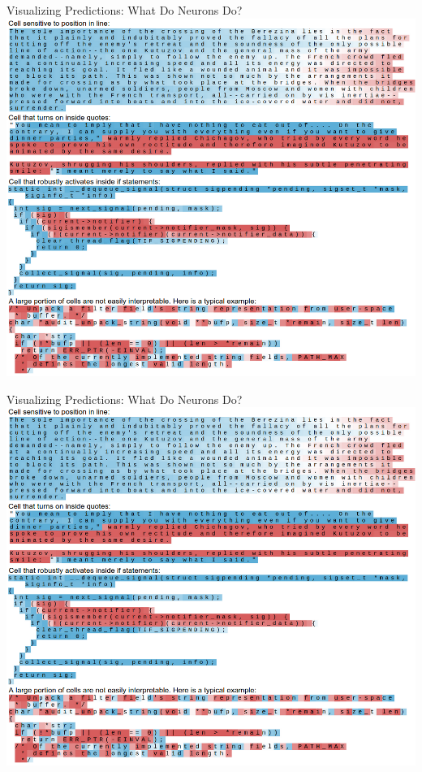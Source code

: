 \documentclass[10pt,xcolor=dvipsnames]{beamer}
\begin{document}
\begin{frame}{Visualizing Predictions: What Do Neurons Do?}
  \includegraphics[width=\linewidth,trim=0 17cm 0 0,clip]{fig/lstm-pred-5.png}
\end{frame}
\begin{frame}{Visualizing Predictions: What Do Neurons Do?}
  \includegraphics[width=\linewidth,trim=0 0 0 13.5cm,clip]{fig/lstm-pred-5.png}
\end{frame}
\end{document}
